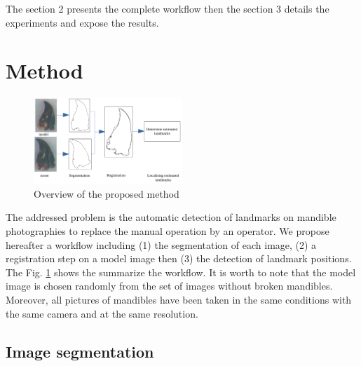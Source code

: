 \documentclass[twoside,twocolumn,10pt]{article}
\begin{document}
The section 2 presents the complete workflow then the section 3 details the experiments and expose the results. 


\section{Method}

\begin{figure}[htb]
    \centering
    \includegraphics[width=0.5\textwidth]{./images/method}
    \caption{Overview of the proposed method}
    \label{fig:method}
\end{figure}
The addressed problem is the automatic detection of landmarks on mandible photographies to replace the manual operation by an operator.
We propose hereafter a workflow including (1) the segmentation of each image, (2) a registration step on a model image then (3) the detection of landmark positions.
The Fig. \ref{fig:method} shows the summarize the workflow.
It is worth to note that the model image is chosen randomly from the set of images without broken mandibles.
Moreover, all pictures of mandibles have been taken in the same conditions with the same camera and at the same resolution.


\subsection{Image segmentation}
\end{document}
